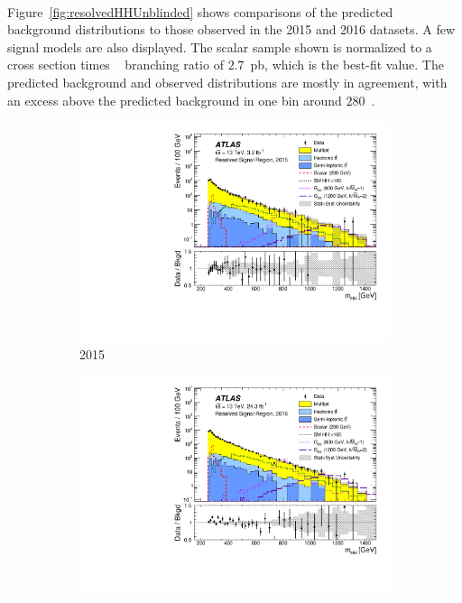 \paragraph{}
Figure~\ref{fig:resolvedHHUnblinded} shows comparisons of the predicted \mfourj~ background distributions to those observed in the 2015 and 2016 datasets. 
A few signal models are also displayed. 
The scalar sample shown is normalized to a cross section times \hbb~ branching ratio of $2.7$~pb, which is the best-fit value. 
The predicted background and observed distributions are mostly in agreement, with an excess above the predicted background in one bin around $280$~\GeV.

\begin{figure}[htb!]
\begin{center}
    \captionsetup{justification=centering}
    \hspace{-2cm}
    \begin{subfigure}[b]{0.39\textwidth}
        \includegraphics[width=\textwidth,angle=-90]{figures/resolved/results/data_2015_hh_v_logy.pdf}
        \caption{2015}
        \label{fig:resolvedHHUnblinded-2015}
    \end{subfigure}
    \quad \quad \quad
    \begin{subfigure}[b]{0.39\textwidth}
        \includegraphics[width=\textwidth,angle=-90]{figures/resolved/results/data_2016_hh_v_logy.pdf}

\end{subfigure}
\end{center}
\end{figure}
